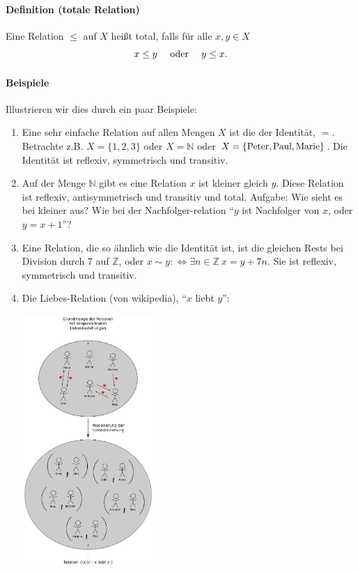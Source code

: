 \documentclass[a4paper,11pt,abstracton]{scrartcl}
\begin{document}
\paragraph{Definition (totale Relation)} Eine Relation $\leq$ auf $X$ heißt total, falls für alle $x,y \in X$
\begin{equation}
 x \leq y \quad \textnormal{ oder } \quad y \leq x.
\end{equation}
\paragraph{Beispiele} Illustrieren wir dies durch ein paar Beispiele:
\begin{enumerate}
 \item Eine sehr einfache Relation auf allen Mengen $X$ ist die der Identität, $=$. Betrachte z.B. $X = \{1,2,3\}$ oder $X = \mathbb{N}$ oder $X= \{ \textnormal{Peter}, \textnormal{Paul}, \textnormal{Marie} \}$. Die Identität ist reflexiv, symmetrisch und transitiv.
 \item Auf der Menge $\mathbb{N}$ gibt es eine Relation $x$ ist kleiner gleich $y$. Diese Relation ist reflexiv, antisymmetrisch und transitiv und total. Aufgabe: Wie sieht es bei kleiner aus? Wie bei der Nachfolger-relation ``$y$ ist Nachfolger von $x$, oder $y = x +1$''?
 \item Eine Relation, die so ähnlich wie die Identität ist, ist die gleichen Rests bei Division durch 7 auf $\mathbb{Z}$, oder $x \sim y :\Leftrightarrow \exists n \in \mathbb{Z} \ x = y + 7n$. Sie ist reflexiv, symmetrisch und transitiv.
 \item Die Liebes-Relation (von wikipedia), ``$x$ liebt $y$'':
 \begin{center}
  \includegraphics[width=5cm]{liebesrelation}
 \end{center}
\end{enumerate}
\end{document}
